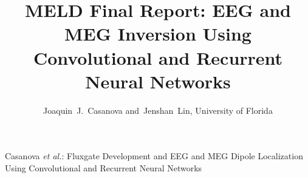 \documentclass[journal,12pt,onecolumn,draftclsnofoot]{IEEEtran}
\begin{document}

\title{MELD Final Report: EEG and MEG Inversion Using Convolutional and Recurrent Neural Networks}


\author{Joaquin~J.~Casanova and~Jenshan~Lin, University of Florida}%


%
{Casanova \MakeLowercase{\textit{et al.}}: Fluxgate Development and EEG and MEG Dipole Localization Using Convolutional and Recurrent Neural Networks}
\maketitle
\end{document}
